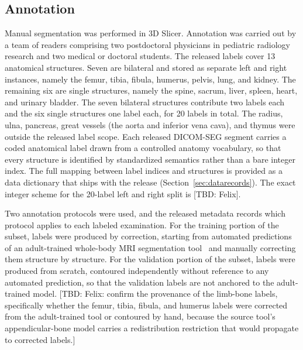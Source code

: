 \subsection*{Annotation}\label{subsec:annotation}
Manual segmentation was performed in 3D Slicer.
Annotation was carried out by a team of readers comprising two postdoctoral physicians in pediatric radiology research and two medical or doctoral students.
The released labels cover 13 anatomical structures.
Seven are bilateral and stored as separate left and right instances, namely the femur, tibia, fibula, humerus, pelvis, lung, and kidney.
The remaining six are single structures, namely the spine, sacrum, liver, spleen, heart, and urinary bladder.
The seven bilateral structures contribute two labels each and the six single structures one label each, for 20 labels in total.
The radius, ulna, pancreas, great vessels (the aorta and inferior vena cava), and thymus were outside the released label scope.
Each released DICOM-SEG segment carries a coded anatomical label drawn from a controlled anatomy vocabulary, so that every structure is identified by standardized semantics rather than a bare integer index.
The full mapping between label indices and structures is provided as a data dictionary that ships with the release (Section~\ref{sec:datarecords}).
The exact integer scheme for the 20-label left and right split is [TBD: Felix].

Two annotation protocols were used, and the released metadata records which protocol applies to each labeled examination.
For the training portion of the subset, labels were produced by correction, starting from automated predictions of an adult-trained whole-body MRI segmentation tool~\cite{Wasserthal_2025} and manually correcting them structure by structure.
For the validation portion of the subset, labels were produced from scratch, contoured independently without reference to any automated prediction, so that the validation labels are not anchored to the adult-trained model.
[TBD: Felix: confirm the provenance of the limb-bone labels, specifically whether the femur, tibia, fibula, and humerus labels were corrected from the adult-trained tool or contoured by hand, because the source tool's appendicular-bone model carries a redistribution restriction that would propagate to corrected labels.]

